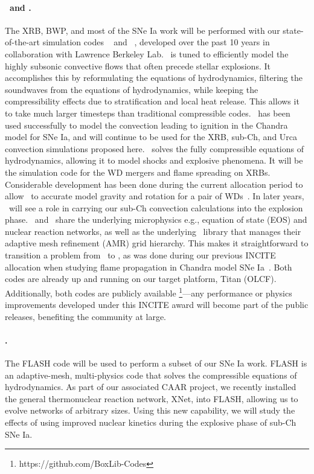 \documentclass[11pt,letterpaper,english]{article}
\begin{document}
\paragraph{\maestro\ and \castro.}
%
The XRB, BWP, and most of the SNe Ia work will be performed with our
state-of-the-art simulation codes \maestro~\cite{multilevel} and
\castro~\cite{castro:I}, developed over the past 10 years in
collaboration with Lawrence Berkeley Lab.  \maestro\ is tuned to
efficiently model the highly subsonic convective flows that often
precede stellar explosions.  It accomplishes this by reformulating the
equations of hydrodynamics, filtering the soundwaves from the
equations of hydrodynamics, while keeping the compressibility effects
due to stratification and local heat release.  This allows it to take
much larger timesteps than traditional compressible codes.
\maestro\ has been used successfully to model the convection leading
to ignition in the Chandra model for SNe Ia, and will continue to be
used for the XRB, sub-Ch, and Urca convection simulations proposed
here.  \castro\ solves the fully compressible equations of
hydrodynamics, allowing it to model shocks and explosive phenomena.
It will be the simulation code for the WD mergers and flame
spreading on XRBs.  Considerable development has been done during the
current allocation period to allow \castro\ to accurate model gravity
and rotation for a pair of WDs~\cite{katz:2016}.  In later years, \castro\
will see a role in carrying our sub-Ch convection calculations into
the explosion phase.  \maestro\ and \castro\ share the underlying
microphysics e.g., equation of state (EOS) and nuclear reaction
networks, as well as the underlying \boxlib\ library that manages
their adaptive mesh refinement (AMR) grid hierarchy.  This makes it
straightforward to transition a problem from \maestro\ to \castro, as
was done during our previous INCITE allocation when studying flame
propagation in Chandra model SNe Ia~\cite{Mal14}.  Both codes are
already up and running on our target platform, Titan (OLCF).
Additionally, both codes are publicly available%
\footnote{https://github.com/BoxLib-Codes}---any performance or
physics improvements developed under this INCITE award will become
part of the public releases, benefiting the community at large.

\paragraph{\flash.}
%
The FLASH code will be used to perform a subset of our SNe Ia work. FLASH is an adaptive-mesh, multi-physics code that solves the compressible equations of hydrodynamics. As part of our associated CAAR project, we recently installed the general thermonuclear reaction network, XNet, into FLASH, allowing us to evolve networks of arbitrary sizes. Using this new capability, we will study the effects of using improved nuclear kinetics during the explosive phase of sub-Ch SNe Ia.
\end{document}
